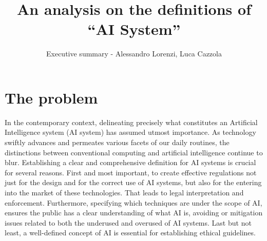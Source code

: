 \documentclass[12pt]{article}
\begin{document}
\title{An analysis on the definitions of “AI System”} %
\author{Executive summary - Alessandro Lorenzi, Luca Cazzola} %


\date{}

\maketitle  %



\section{The problem}
	 
In the contemporary context, delineating precisely what constitutes an Artificial Intelligence system (AI system) has assumed utmost importance. As technology swiftly advances and permeates various facets of our daily routines, the distinctions between conventional computing and artificial intelligence continue to blur. Establishing a clear and comprehensive definition for AI systems is crucial for several reasons. First and most important, to create effective regulations not just for the design and for the correct use of AI systems, but also for the entering into the market of these technologies. That leads to legal interpretation and enforcement. Furthermore, specifying which techniques are under the scope of AI, ensures the public has a clear understanding of what AI is, avoiding or mitigation issues related to both the underused and overused of AI systems. Last but not least, a well-defined concept of AI is essential for establishing ethical guidelines.
\end{document}
